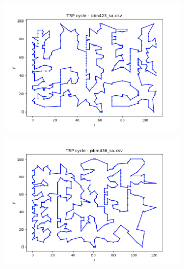 \documentclass[12pt]{article}
\begin{document}
\begin{figure}[htpb]
\begin{subfigure}[b]{0.475\textwidth}
            \end{subfigure}
            \hfill
            \begin{subfigure}[b]{0.475\textwidth}
                \includegraphics[width=\linewidth]{img/pbn423_sa.png}
            \end{subfigure}
            \centering
            \begin{subfigure}[b]{0.475\textwidth}
                \includegraphics[width=\linewidth]{img/pbm436_sa.png}
            \end{subfigure}
            \hfill
            \begin{subfigure}[b]{0.475\textwidth}

\end{subfigure}
\end{figure}
\end{document}
